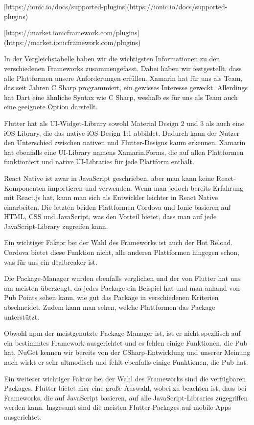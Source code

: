 [https://ionic.io/docs/supported-plugins](https://ionic.io/docs/supported-plugins)

[https://market.ionicframework.com/plugins](https://market.ionicframework.com/plugins)

In der Vergleichstabelle haben wir die wichtigsten Informationen zu den verschiedenen Frameworks zusammengefasst. Dabei haben wir festgestellt, dass alle Plattformen unsere Anforderungen erfüllen. Xamarin hat für uns als Team, das seit Jahren C Sharp programmiert, ein gewisses Interesse geweckt. Allerdings hat Dart eine ähnliche Syntax wie C Sharp, weshalb es für uns als Team auch eine geeignete Option darstellt.

Flutter hat als UI-Widget-Library sowohl Material Design 2 und 3 als auch eine iOS Library, die das native iOS-Design 1:1 abbildet. Dadurch kann der Nutzer den Unterschied zwischen nativen und Flutter-Designs kaum erkennen. Xamarin hat ebenfalls eine UI-Library namens Xamarin.Forms, die auf allen Plattformen funktioniert und native UI-Libraries für jede Plattform enthält.

React Native ist zwar in JavaScript geschrieben, aber man kann keine React-Komponenten importieren und verwenden. Wenn man jedoch bereits Erfahrung mit React.js hat, kann man sich als Entwickler leichter in React Native einarbeiten. Die letzten beiden Plattformen Cordova und Ionic basieren auf HTML, CSS und JavaScript, was den Vorteil bietet, dass man auf jede JavaScript-Library zugreifen kann.

Ein wichtiger Faktor bei der Wahl des Frameworks ist auch der Hot Reload. Cordova bietet diese Funktion nicht, alle anderen Plattformen hingegen schon, was für uns ein dealbreaker ist.

Die Package-Manager wurden ebenfalls verglichen und der von Flutter hat uns am meisten überzeugt, da jedes Package ein Beispiel hat und man anhand von Pub Points sehen kann, wie gut das Package in verschiedenen Kriterien abschneidet. Zudem kann man sehen, welche Plattformen das Package unterstützt.

Obwohl npm der meistgenutzte Package-Manager ist, ist er nicht spezifisch auf ein bestimmtes Framework ausgerichtet und es fehlen einige Funktionen, die Pub hat. NuGet kennen wir bereits von der CSharp-Entwicklung und unserer Meinung nach wirkt er sehr altmodisch und fehlt ebenfalls einige Funktionen, die Pub hat.

Ein weiterer wichtiger Faktor bei der Wahl des Frameworks sind die verfügbaren Packages. Flutter bietet hier eine große Auswahl, wobei zu beachten ist, dass bei Frameworks, die auf JavaScript basieren, auf alle JavaScript-Libraries zugegriffen werden kann. Insgesamt sind die meisten Flutter-Packages auf mobile Apps ausgerichtet.

